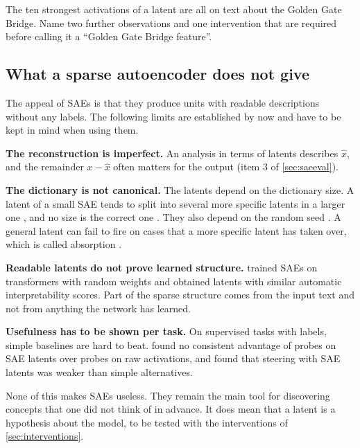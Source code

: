 \begin{exercise}\label{ex:ggb}
The ten strongest activations of a latent are all on text about the Golden Gate Bridge. Name two further
observations and one intervention that are required before calling it a ``Golden Gate Bridge feature''.
\end{exercise}

\subsection{What a sparse autoencoder does not give}

The appeal of SAEs is that they produce units with readable descriptions without any labels. The following
limits are established by now and have to be kept in mind when using them.

\begin{caution}
\textbf{The reconstruction is imperfect.} An analysis in terms of latents describes $\hat x$, and the remainder
$x-\hat x$ often matters for the output (item 3 of \cref{sec:saeeval}).

\textbf{The dictionary is not canonical.} The latents depend on the dictionary size. A latent of a small SAE
tends to split into several more specific latents in a larger one \citep{bricken2023monosemanticity}, and no
size is the correct one \citep{leask2025sparse}. They also depend on the random seed
\citep{paulo2025sparse}. A general latent can fail to fire on cases that a more specific latent has taken over,
which is called absorption \citep{chanin2024absorption}.

\textbf{Readable latents do not prove learned structure.} \citet{heap2025sparse} trained SAEs on transformers
with random weights and obtained latents with similar automatic interpretability scores. Part of the
sparse structure comes from the input text and not from anything the network has learned.

\textbf{Usefulness has to be shown per task.} On supervised tasks with labels, simple baselines are hard to
beat. \citet{kantamneni2025sparse} found no consistent advantage of probes on SAE latents over probes on raw
activations, and \citet{wu2025axbench} found that steering with SAE latents was weaker than simple alternatives.
\end{caution}

None of this makes SAEs useless. They remain the main tool for discovering concepts that one did not think of in
advance. It does mean that a latent is a hypothesis about the model, to be tested with the interventions of
\cref{sec:interventions}.

